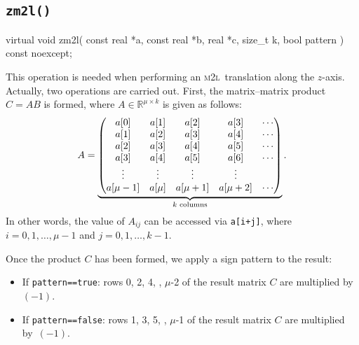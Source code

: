 \documentclass{scrbook}
\newcommand{\MtoL}{\textsc{m2l}}
\newcommand{\reals}{\ensuremath{\mathbb{R}}}
\begin{document}
\subsection{\texorpdfstring{\lstinline|zm2l()|}{zm2l()}}
\begin{cppcode*}
virtual void zm2l( const real *a, const real *b, real *c, size_t k,
                   bool pattern ) const noexcept;
\end{cppcode*}
This operation is needed when performing an \MtoL\ translation along the
$z$-axis. Actually, two operations are carried out. First, the
matrix--matrix product $C=AB$ is formed, where $A\in\reals^{\mu\times k}$ is
given as follows:
\begin{equation}
A =
\underbrace{%
\begin{pmatrix}
a[0]     & a[1]   & a[2]     & a[3]     & \cdots \\
a[1]     & a[2]   & a[3]     & a[4]     & \cdots \\
a[2]     & a[3]   & a[4]     & a[5]     & \cdots \\
a[3]     & a[4]   & a[5]     & a[6]     & \cdots \\
\vdots   & \vdots & \vdots   & \vdots   &        \\
a[\mu-1] & a[\mu] & a[\mu+1] & a[\mu+2] & \cdots
\end{pmatrix}}_{\text{$k$ columns}}.
\end{equation}
In other words, the value of $A_{ij}$ can be accessed via \lstinline|a[i+j]|,
where $i=0,1,\dotsc,\mu-1$ and $j=0,1,\dotsc,k-1$.

Once the product $C$ has been formed, we apply a sign pattern to the result:
\begin{itemize}
\item If \lstinline|pattern==true|: rows 0, 2, 4, \textellipsis, $\mu$-2 of the
result matrix $C$ are multiplied by~$(-1)$.
\item If \lstinline|pattern==false|: rows 1, 3, 5, \textellipsis, $\mu$-1 of the
result matrix $C$ are multiplied by~$(-1)$.
\end{itemize}
\end{document}
